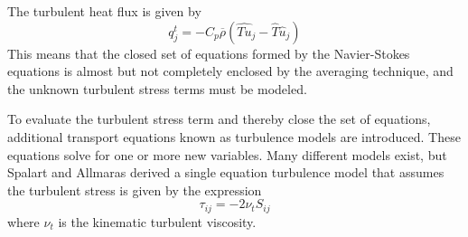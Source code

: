 The turbulent heat flux is given by
\begin{equation}
  q_j^t = -C_p\overline{\rho}\left(\widehat{Tu}_j-\hat{T}\hat{u}_j\right) \label{eq:FavreEnd}
\end{equation}
This means that the closed set of equations formed by the Navier-Stokes equations is almost but not completely enclosed by the averaging technique, and the unknown turbulent stress terms must be modeled.

To evaluate the turbulent stress term and thereby close the set of equations, additional transport equations known as turbulence models are introduced. These equations solve for  one or more new variables. Many different models exist, but Spalart and Allmaras\cite{SA} derived a single equation turbulence model that assumes the turbulent stress is given by the expression
\begin{equation}
  \tau_{ij} = -2\nu_t{S}_{ij}
\end{equation}
where $\nu_t$ is the kinematic turbulent viscosity.


